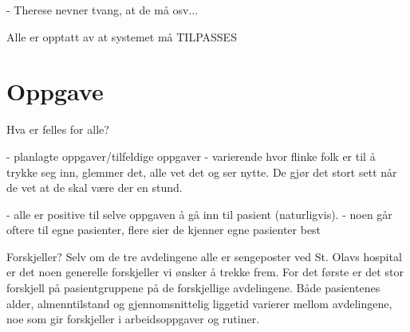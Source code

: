 - Therese nevner tvang, at de må osv...

Alle er opptatt av at systemet må TILPASSES

\section{Oppgave}

Hva er felles for alle?

- planlagte oppgaver/tilfeldige oppgaver
- varierende hvor flinke folk er til å trykke seg inn, glemmer det, alle vet det og ser nytte. De gjør det stort sett når de vet at de skal være der en stund.

- alle er positive til selve oppgaven å gå inn til pasient (naturligvis). 
	- noen går oftere til egne pasienter, flere sier de kjenner egne pasienter best


Forskjeller?
Selv om de tre avdelingene alle er sengeposter ved St. Olavs hospital er det noen generelle forskjeller vi ønsker å trekke frem. 
For det første er det stor forskjell på pasientgruppene på de forskjellige avdelingene. Både pasientenes alder, almenntilstand og gjennomsnittelig liggetid varierer mellom avdelingene, noe som gir forskjeller i arbeidsoppgaver og rutiner.  



